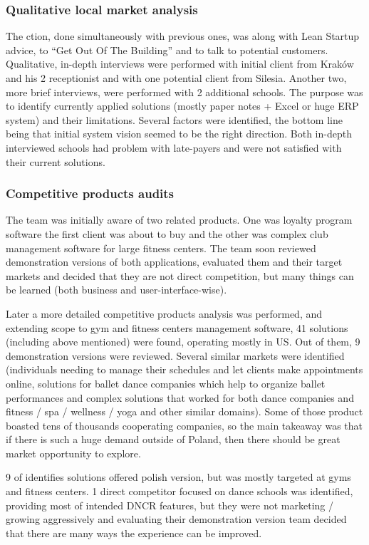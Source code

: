 \documentclass{article}
\begin{document}
\subsubsection{Qualitative local market analysis}
The ction, done simultaneously with previous ones, was along with Lean Startup advice, to ``Get Out Of The Building'' and to talk to potential customers. Qualitative, in-depth interviews were performed with initial client from Kraków and his 2 receptionist and with one potential client from Silesia. Another two, more brief interviews, were performed with 2 additional schools. The purpose was to identify currently applied solutions (mostly paper notes + Excel or huge ERP system) and their limitations. Several factors were identified, the bottom line being that initial system vision seemed to be the right direction. Both in-depth interviewed schools had problem with late-payers and were not satisfied with their current solutions.

\subsubsection{Competitive products audits}
The team was initially aware of two related products. One was loyalty program software the first client was about to buy and the other was complex club management software for large fitness centers. The team soon reviewed demonstration versions of both applications, evaluated them and their target markets and decided that they are not direct competition, but many things can be learned (both business and user-interface-wise).

Later a more detailed competitive products analysis was performed, and extending scope to gym and fitness centers management software, 41 solutions (including above mentioned) were found, operating mostly in US. Out of them, 9 demonstration versions were reviewed. Several similar markets were identified (individuals needing to manage their schedules and let clients make appointments online, solutions for ballet dance companies which help to organize ballet performances and complex solutions that worked for both dance companies and fitness / spa / wellness / yoga and other similar domains). Some of those product boasted tens of thousands cooperating companies, so the main takeaway was that if there is such a huge demand outside of Poland, then there should be great market opportunity to explore.

9 of identifies solutions offered polish version, but was mostly targeted at gyms and fitness centers. 1 direct competitor focused on dance schools was identified, providing most of intended DNCR features, but they were not marketing / growing aggressively and evaluating their demonstration version team decided that there are many ways the experience can be improved.
\end{document}
